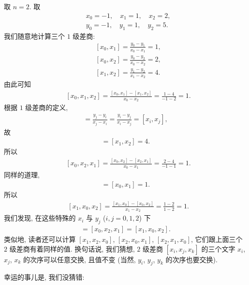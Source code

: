 \begin{example}
    取 $n = 2$. 取
    \begin{align*}
         & x_0 = -1, \quad x_1 = 1, \quad x_2 = 2, \\
         & y_0 = -1, \quad y_1 = 1, \quad y_2 = 5.
    \end{align*}
    我们随意地计算三个 $1$ 级差商:
    \begin{align*}
         & [x_0, x_1] = \frac{y_0 - y_1}{x_0 - x_1} = 1, \\
         & [x_0, x_2] = \frac{y_0 - y_2}{x_0 - x_2} = 2, \\
         & [x_1, x_2] = \frac{y_1 - y_2}{x_1 - x_2} = 4.
    \end{align*}
    由此可知
    \begin{align*}
         & [x_0, x_1, x_2] = \frac{[x_0, x_1] - [x_1, x_2]}{x_0 - x_2} = \frac{1 - 4}{-1 - 2} = 1.
    \end{align*}
    根据 $1$ 级差商的定义,
    \begin{align*}
        [x_j, x_i] = \frac{y_j - y_i}{x_j - x_i} = \frac{y_i - y_j}{x_i - x_j} = [x_i, x_j],
    \end{align*}
    故
    \begin{align*}
        [x_2, x_1] = [x_1, x_2] = 4.
    \end{align*}
    所以
    \begin{align*}
         & [x_0, x_2, x_1] = \frac{[x_0, x_2] - [x_2, x_1]}{x_0 - x_1} = \frac{2 - 4}{-1 - 1} = 1.
    \end{align*}
    同样的道理,
    \begin{align*}
        [x_1, x_0] = [x_0, x_1] = 1.
    \end{align*}
    所以
    \begin{align*}
         & [x_1, x_0, x_2] = \frac{[x_1, x_0] - [x_0, x_2]}{x_1 - x_2} = \frac{1 - 2}{1 - 2} = 1.
    \end{align*}
    我们发现, 在这些特殊的 $x_i$ 与 $y_j$ ($i,j = 0,1,2$) 下
    \begin{align*}
        [x_0, x_1, x_2] = [x_0, x_2, x_1] = [x_1, x_0, x_2].
    \end{align*}
    类似地, 读者还可以计算 $[x_1, x_2, x_0]$, $[x_2, x_0, x_1]$, $[x_2, x_1, x_0]$, 它们跟上面三个 $2$ 级差商有着同样的值. 换句话说, 我们猜想, $2$ 级差商 $[x_i, x_j, x_k]$ 的三个文字 $x_i$, $x_j$, $x_k$ 的次序可以任意交换, 且值不变 (当然, $y_i$, $y_j$, $y_k$ 的次序也要交换).
\end{example}

幸运的事{\scriptsize 儿}是, 我们没猜错:


